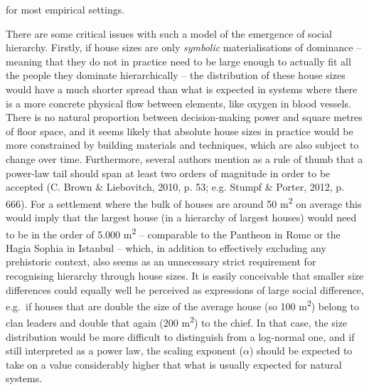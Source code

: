 \documentclass[
  12pt,
]{book}
\begin{document}
for most empirical settings.

There are some critical issues with such a model of the emergence of social hierarchy. Firstly, if house sizes are only \emph{symbolic} materialisations of dominance -- meaning that they do not in practice need to be large enough to actually fit all the people they dominate hierarchically -- the distribution of these house sizes would have a much shorter spread than what is expected in systems where there is a more concrete physical flow between elements, like oxygen in blood vessels. There is no natural proportion between decision-making power and square metres of floor space, and it seems likely that absolute house sizes in practice would be more constrained by building materials and techniques, which are also subject to change over time. Furthermore, several authors mention as a rule of thumb that a power-law tail should span at least two orders of magnitude in order to be accepted (C. Brown \& Liebovitch, 2010, p. 53; e.g. Stumpf \& Porter, 2012, p. 666). For a settlement where the bulk of houses are around 50 m\textsuperscript{2} on average this would imply that the largest house (in a hierarchy of largest houses) would need to be in the order of 5.000 m\textsuperscript{2} -- comparable to the Pantheon in Rome or the Hagia Sophia in Istanbul -- which, in addition to effectively excluding any prehistoric context, also seems as an unnecessary strict requirement for recognising hierarchy through house sizes. It is easily conceivable that smaller size differences could equally well be perceived as expressions of large social difference, e.g.~if houses that are double the size of the average house (so 100 m\textsuperscript{2}) belong to clan leaders and double that again (200 m\textsuperscript{2}) to the chief. In that case, the size distribution would be more difficult to distinguish from a log-normal one, and if still interpreted as a power law, the scaling exponent (\(\alpha\)) should be expected to take on a value considerably higher that what is usually expected for natural systems.
\end{document}
